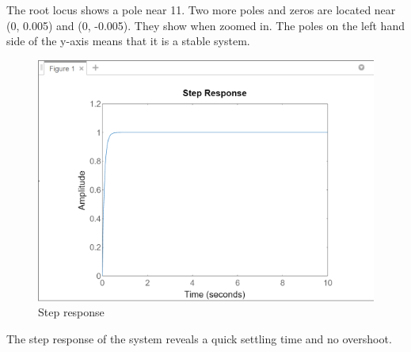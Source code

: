 The root locus shows a pole near 11. Two more poles and zeros are located near (0, 0.005) and (0, -0.005). They show when zoomed in.
The poles on the left hand side of the y-axis means that it is a stable system.

\begin{figure}[h]
    \centering
    \includegraphics[width = 1\textwidth]{Code/Images/Step-Response.png}
    \caption{Step response}
    \label{fig:Step response}
\end{figure}

The step response of the system reveals a quick settling time and no overshoot.

